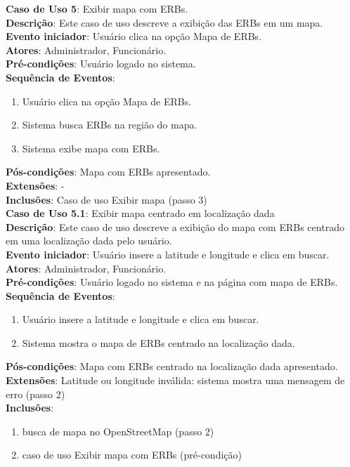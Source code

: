 \documentclass[]{politex}
\begin{document}
\noindent \textbf{Caso de Uso 5}: Exibir mapa com ERBs. \\
\textbf{Descrição}: Este caso de uso descreve a exibição das ERBs em um mapa. \\
\textbf{Evento iniciador}: Usuário clica na opção Mapa de ERBs. \\
\textbf{Atores}: Administrador, Funcionário. \\
\textbf{Pré-condições}: Usuário logado no sistema. \\
\textbf{Sequência de Eventos}:
\begin{enumerate}
\item Usuário clica na opção Mapa de ERBs.
\item Sistema busca ERBs na região do mapa.
\item Sistema exibe mapa com ERBs.
\end{enumerate}
\textbf{Pós-condições}: Mapa com ERBs apresentado. \\
\textbf{Extensões}: - \\
\textbf{Inclusões}: Caso de uso Exibir mapa (passo 3) \\

\noindent \textbf{Caso de Uso 5.1}: Exibir mapa centrado em localização dada \\
\textbf{Descrição}: Este caso de uso descreve a exibição do mapa com ERBs 
centrado em uma localização dada pelo usuário.  \\
\textbf{Evento iniciador}: Usuário insere a latitude e longitude e clica em buscar. \\
\textbf{Atores}: Administrador, Funcionário. \\
\textbf{Pré-condições}: Usuário logado no sistema e na página com mapa de ERBs. \\
\textbf{Sequência de Eventos}:
\begin{enumerate}
\item Usuário insere a latitude e longitude e clica em buscar.
\item Sistema mostra o mapa de ERBs centrado na localização dada.
\end{enumerate}
\textbf{Pós-condições}: Mapa com ERBs centrado na localização dada apresentado. \\
\textbf{Extensões}: Latitude ou longitude inválida: sistema mostra uma mensagem de erro (passo 2) \\
\textbf{Inclusões}:
\begin{enumerate}
\item busca de mapa no OpenStreetMap (passo 2)
\item caso de uso Exibir mapa com ERBs (pré-condição)
\end{enumerate}
\end{document}
